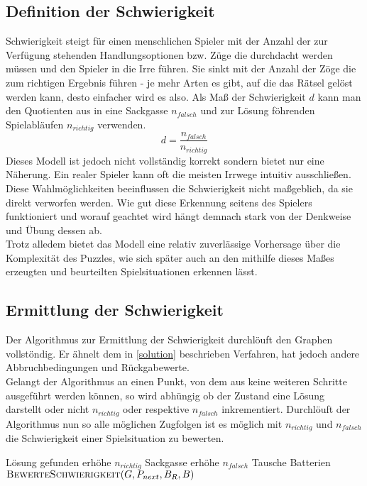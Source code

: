 \documentclass[a4paper,10pt,ngerman]{scrartcl}
\begin{document}
\subsection{Definition der Schwierigkeit}
Schwierigkeit steigt für einen menschlichen Spieler mit der Anzahl der zur Verfügung stehenden Handlungsoptionen bzw. Züge die durchdacht werden müssen und den Spieler in die Irre führen. Sie sinkt mit der Anzahl der Zöge die zum richtigen Ergebnis führen - je mehr Arten es gibt, auf die das Rätsel gelöst werden kann, desto einfacher wird es also.
Als Maß der Schwierigkeit $d$ kann man den Quotienten aus in eine Sackgasse $n_{falsch}$ und zur Lösung föhrenden Spielabläufen $n_{richtig}$  verwenden.
\begin{equation}
d = \frac{n_{falsch}}{n_{richtig}}
\end{equation}
Dieses Modell ist jedoch nicht vollständig korrekt sondern bietet nur eine Näherung. Ein realer Spieler kann oft die meisten Irrwege intuitiv ausschließen. Diese Wahlmöglichkeiten beeinflussen die Schwierigkeit nicht maßgeblich, da sie direkt verworfen werden. Wie gut diese Erkennung seitens des Spielers funktioniert und worauf geachtet wird hängt demnach stark von der Denkweise und Übung dessen ab. \\
Trotz alledem bietet das Modell eine relativ zuverlässige Vorhersage über die Komplexität des Puzzles, wie sich später auch an den mithilfe dieses Maßes erzeugten und beurteilten Spielsituationen erkennen lässt.

\subsection{Ermittlung der Schwierigkeit}
Der Algorithmus zur Ermittlung der Schwierigkeit durchlöuft den Graphen vollstöndig. Er ähnelt dem in \ref{solution} beschrieben Verfahren, hat jedoch andere Abbruchbedingungen und Rückgabewerte. \\
Gelangt der Algorithmus an einen Punkt, von dem aus keine weiteren Schritte ausgeführt werden können, so wird abhüngig ob der Zustand eine Lösung darstellt oder nicht $n_{richtig}$ oder respektive $n_{falsch}$ inkrementiert. Durchlöuft der Algorithmus nun so alle möglichen Zugfolgen ist es möglich mit $n_{richtig}$ und $n_{falsch}$ die Schwierigkeit einer Spielsituation zu bewerten.
\\
\begin{algorithmic}[1]
	\Comment Lösung gefunden
		\State  erhöhe $n_{richtig}$
	 \Comment Sackgasse
		\State  erhöhe $n_{falsch}$
	\EndIf
			\State Tausche Batterien
		\EndIf
		\State $\textsc{BewerteSchwierigkeit}(G, P_{next}, B_R,  B)$
	\EndFor
\EndProcedure
\end{algorithmic}
\end{document}
